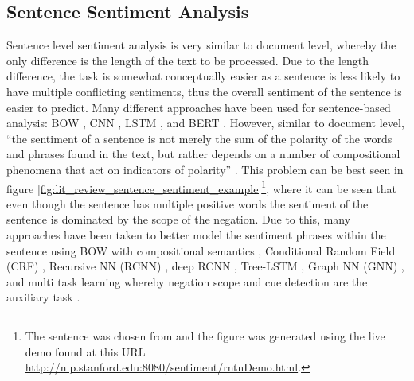 \subsection{Sentence Sentiment Analysis}
Sentence level sentiment analysis is very similar to document level, whereby the only difference is the length of the text to be processed. Due to the length difference, the task is somewhat conceptually easier as a sentence is less likely to have multiple conflicting sentiments, thus the overall sentiment of the sentence is easier to predict. Many different approaches have been used for sentence-based analysis: BOW \citep{wang-manning-2012-baselines}, CNN \citep{kim-2014-convolutional, kalchbrenner-etal-2014-convolutional}, LSTM \citep{brahma2018improved}, and BERT \citep{devlin-etal-2019-bert}. However, similar to document level, ``the sentiment of a sentence is not merely the sum of the polarity of the words and phrases found in the text, but rather depends on a number of compositional phenomena that act on indicators of polarity'' \citep{barnes2019improving}. This problem can be best seen in figure \ref{fig:lit_review_sentence_sentiment_example}\footnote{The sentence was chosen from \citet{barnes2019improving} and the figure was generated using the live demo found at this URL \url{http://nlp.stanford.edu:8080/sentiment/rntnDemo.html}.}, where it can be seen that even though the sentence has multiple positive words the sentiment of the sentence is dominated by the scope of the negation. Due to this, many approaches have been taken to better model the sentiment phrases within the sentence using BOW with compositional semantics \citep{choi-cardie-2008-learning}, Conditional Random Field (CRF) \citep{nakagawa-etal-2010-dependency}, Recursive NN (RCNN) \citep{socher-etal-2012-semantic}, deep RCNN \citep{irsoy2014deep}, Tree-LSTM \citep{tai-etal-2015-improved}, Graph NN (GNN) \citep{zhang-zhang-2019-tree}, and multi task learning whereby negation scope and cue detection are the auxiliary task \citep{barnes2019improving}.

